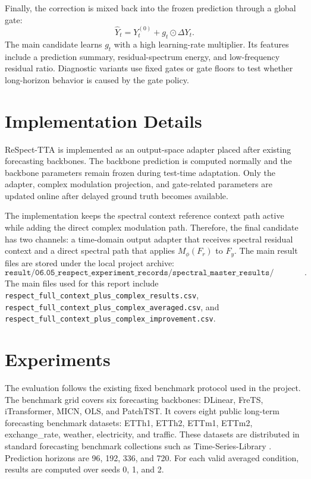 \documentclass[10pt]{article}
\begin{document}
Finally, the correction is mixed back into the frozen prediction through a global gate:
\[
\hat{Y}_t = Y_t^{(0)} + g_t \odot \Delta Y_t.
\]
The main candidate learns \(g_t\) with a high learning-rate multiplier. Its features include a prediction summary, residual-spectrum energy, and low-frequency residual ratio. Diagnostic variants use fixed gates or gate floors to test whether long-horizon behavior is caused by the gate policy.

\section{Implementation Details}

ReSpect-TTA is implemented as an output-space adapter placed after existing forecasting backbones. The backbone prediction is computed normally and the backbone parameters remain frozen during test-time adaptation. Only the adapter, complex modulation projection, and gate-related parameters are updated online after delayed ground truth becomes available.

The implementation keeps the spectral context reference context path active while adding the direct complex modulation path. Therefore, the final candidate has two channels: a time-domain output adapter that receives spectral residual context and a direct spectral path that applies \(M_\phi(F_r)\) to \(F_y\). The main result files are stored under the local project archive:
\[
\texttt{result/06.05\_respect\_experiment\_records/spectral\_master\_results/summary/}.
\]
The main files used for this report include \texttt{respect\_full\_context\_plus\_complex\_results.csv}, \texttt{respect\_full\_context\_plus\_complex\_averaged.csv}, and \texttt{respect\_full\_context\_plus\_complex\_improvement.csv}.

\section{Experiments}

The evaluation follows the existing fixed benchmark protocol used in the project. The benchmark grid covers six forecasting backbones: DLinear, FreTS, iTransformer, MICN, OLS, and PatchTST. It covers eight public long-term forecasting benchmark datasets: ETTh1, ETTh2, ETTm1, ETTm2, exchange\_rate, weather, electricity, and traffic. These datasets are distributed in standard forecasting benchmark collections such as Time-Series-Library \cite{tslibdataset,wu2023timesnet}. Prediction horizons are 96, 192, 336, and 720. For each valid averaged condition, results are computed over seeds 0, 1, and 2.
\end{document}
